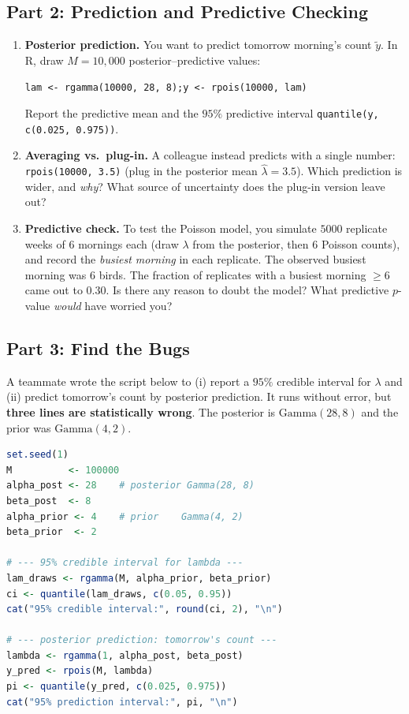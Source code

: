 \documentclass{article}
\begin{document}
\subsection*{Part 2: Prediction and Predictive Checking}
\begin{enumerate}[label={\bfseries (\Alph*)},itemsep=.6em]
    \item \textbf{Posterior prediction.} You want to predict tomorrow morning's count $\tilde{y}$. In R, draw $M = 10{,}000$ posterior--predictive values:
    \begin{center}
    \texttt{lam <- rgamma(10000, 28, 8);\quad y <- rpois(10000, lam)}
    \end{center}
    Report the predictive mean and the $95\%$ predictive interval \texttt{quantile(y, c(0.025, 0.975))}. \\[3em]

    \item \textbf{Averaging vs.\ plug-in.} A colleague instead predicts with a single number: \texttt{rpois(10000, 3.5)} (plug in the posterior mean $\hat\lambda = 3.5$). Which prediction is wider, and \emph{why}? What source of uncertainty does the plug-in version leave out? \\[4em]

    \item \textbf{Predictive check.} To test the Poisson model, you simulate $5000$ replicate weeks of $6$ mornings each (draw $\lambda$ from the posterior, then $6$ Poisson counts), and record the \emph{busiest morning} in each replicate. The observed busiest morning was $6$ birds. The fraction of replicates with a busiest morning $\ge 6$ came out to $0.30$. Is there any reason to doubt the model? What predictive $p$-value \emph{would} have worried you? \\[4em]
\end{enumerate}

\newpage

\subsection*{Part 3: Find the Bugs}
A teammate wrote the script below to (i) report a $95\%$ credible interval for $\lambda$ and (ii) predict tomorrow's count by posterior prediction. It runs without error, but \textbf{three lines are statistically wrong}. The posterior is $\text{Gamma}(28, 8)$ and the prior was $\text{Gamma}(4, 2)$.

\begin{lstlisting}[language=R]
set.seed(1)
M          <- 100000
alpha_post <- 28    # posterior Gamma(28, 8)
beta_post  <- 8
alpha_prior <- 4    # prior    Gamma(4, 2)
beta_prior  <- 2

# --- 95% credible interval for lambda ---
lam_draws <- rgamma(M, alpha_prior, beta_prior)
ci <- quantile(lam_draws, c(0.05, 0.95))
cat("95% credible interval:", round(ci, 2), "\n")

# --- posterior prediction: tomorrow's count ---
lambda <- rgamma(1, alpha_post, beta_post)
y_pred <- rpois(M, lambda)
pi <- quantile(y_pred, c(0.025, 0.975))
cat("95% prediction interval:", pi, "\n")
\end{lstlisting}
\end{document}
